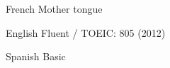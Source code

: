 

\begin{cvskills}

  \cvskill
    {French}
    {Mother tongue}

  \cvskill
    {English}
    {Fluent / TOEIC: 805 (2012)}

  \cvskill
    {Spanish}
    {Basic}

\end{cvskills}
